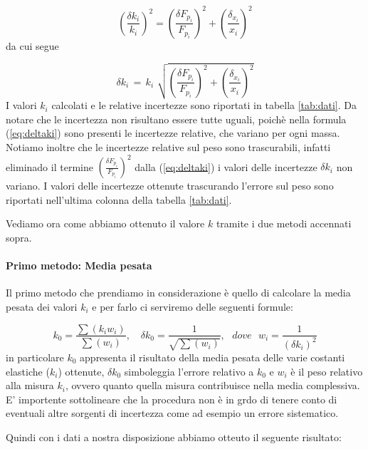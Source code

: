 \begin{equation*}
	\left(\frac{\delta {k_{i}}}{k_{i}}\right)^2  =  \left(\frac{\delta F_{p_{i}}}{F_{p_{i}}}\right)^2  +  \left(\frac{\delta_{x_{i}}}{x_{i}}\right)^2 
\end{equation*}
%
da cui segue

\begin{equation}
	\delta k_{i} \,=\, k_i\,\, \sqrt{\left(\frac{\delta F_{p_{i}}}{F_{p_{i}}}\right)^2 + \left(\frac{\delta_{x_{i}}}{x_{i}}\right)^2} 
    \label{eq:deltaki}
\end{equation}
%
I valori $k_i$ calcolati e le relative incertezze sono riportati in tabella \ref{tab:dati}. Da notare che le incertezza
non risultano essere tutte uguali, poichè nella formula (\ref{eq:deltaki}) sono presenti le incertezze relative, che
variano per ogni massa. Notiamo inoltre che le incertezze relative sul peso sono trascurabili, infatti eliminado il termine
$\left(\frac{\delta F_{p_{i}}}{F_{p_{i}}}\right)^2$ dalla (\ref{eq:deltaki}) i valori delle incertezze $\delta k_i$ non variano.
I valori delle incertezze ottenute trascurando l'errore sul peso sono riportati nell'ultima colonna della tabella \ref{tab:dati}.

Vediamo ora come abbiamo ottenuto il valore $k$ tramite i due metodi accennati sopra.

\paragraph{Primo metodo: Media pesata\\}
Il primo metodo che prendiamo in considerazione è quello di calcolare la media pesata dei valori $k_{i}$ e per farlo ci serviremo delle seguenti formule:

\begin{equation*}
		k_{0} = \frac{\sum (k_i w_i)}{\sum (w_i)} , \,\,\,\,\,\, \delta k_0 = \frac{1}{\sqrt{\sum (w_i)}} , \,\,\,\,dove\,\,\,\, w_i = \frac{1}{(\delta k_i)^2}
\end{equation*}
%
in particolare $k_0$ appresenta il risultato della media pesata delle varie costanti elastiche ($k_i$) ottenute, $\delta k_0$ simboleggia l'errore relativo a $k_0$ e $w_i$ è il peso relativo alla misura $k_i$, ovvero quanto quella misura contribuisce nella media complessiva. E' importente sottolineare che la procedura non è in grdo di tenere conto di eventuali altre sorgenti di incertezza come ad esempio un errore sistematico.

Quindi con i dati a nostra disposizione abbiamo otteuto il seguente risultato:

